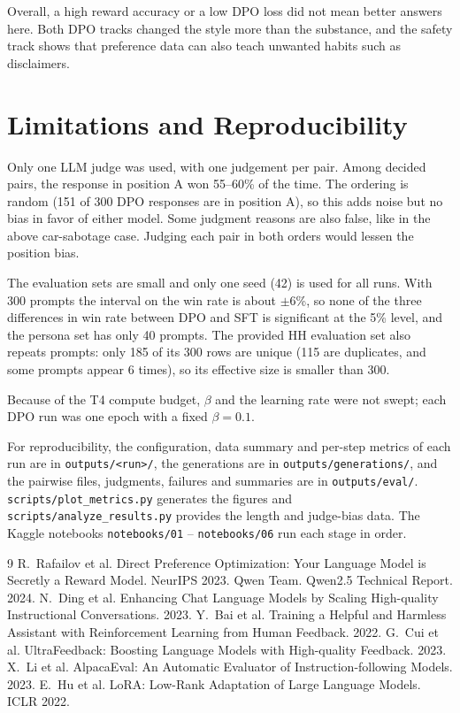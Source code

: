 \documentclass[10pt]{article}
\begin{document}
Overall, a high reward accuracy or a low DPO loss did not mean better answers here. Both DPO tracks changed the style more than the substance, and the safety track shows that preference data can also teach unwanted habits such as disclaimers.

\section{Limitations and Reproducibility}
Only one LLM judge was used, with one judgement per pair. Among decided pairs, the response in position A won 55--60\% of the time. The ordering is random (151 of 300 DPO responses are in position A), so this adds noise but no bias in favor of either model. Some judgment reasons are also false, like in the above car-sabotage case. Judging each pair in both orders would lessen the position bias.

The evaluation sets are small and only one seed (42) is used for all runs. With 300 prompts the interval on the win rate is about $\pm$6\%, so none of the three differences in win rate between DPO and SFT is significant at the 5\% level, and the persona set has only 40 prompts. The provided HH evaluation set also repeats prompts: only 185 of its 300 rows are unique (115 are duplicates, and some prompts appear 6 times), so its effective size is smaller than 300.

Because of the T4 compute budget, $\beta$ and the learning rate were not swept; each DPO run was one epoch with a fixed $\beta = 0.1$.

For reproducibility, the configuration, data summary and per-step metrics of each run are in \texttt{outputs/<run>/}, the generations are in \texttt{outputs/generations/}, and the pairwise files, judgments, failures and summaries are in \texttt{outputs/eval/}. \texttt{scripts/plot\_metrics.py} generates the figures and \texttt{scripts/analyze\_results.py} provides the length and judge-bias data. The Kaggle notebooks \texttt{notebooks/01} -- \texttt{notebooks/06} run each stage in order.

\begin{thebibliography}{9}\small
{} R.~Rafailov et al. Direct Preference Optimization: Your Language Model is Secretly a Reward Model. NeurIPS 2023.
 Qwen Team. Qwen2.5 Technical Report. 2024.
 N.~Ding et al. Enhancing Chat Language Models by Scaling High-quality Instructional Conversations. 2023.
 Y.~Bai et al. Training a Helpful and Harmless Assistant with Reinforcement Learning from Human Feedback. 2022.
 G.~Cui et al. UltraFeedback: Boosting Language Models with High-quality Feedback. 2023.
 X.~Li et al. AlpacaEval: An Automatic Evaluator of Instruction-following Models. 2023.
 E.~Hu et al. LoRA: Low-Rank Adaptation of Large Language Models. ICLR 2022.
\end{thebibliography}
\end{document}
